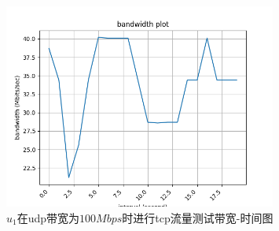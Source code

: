 \begin{figure}[h]
	\centering
	\includegraphics[width=0.8\textwidth]{image/u1-100.tcp.png}
	\caption{$u_1$在udp带宽为$100Mbps$时进行tcp流量测试带宽-时间图}
 	\label{fig:u100}
\end{figure}